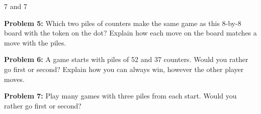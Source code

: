 \documentclass[12pt]{extarticle}
\newcommand{\prob}[1]{\textbf{Problem #1:}}
\begin{document}
\begin{minipage}[b]{1.55in}
\vspace{0.12in}7 and 7

\vspace{0.35in}
\end{minipage}
\vspace{0.6in}

\noindent\begin{minipage}[t]{3.3in}\vspace{0pt}\raggedright
\prob{5} Which two piles of counters make the same game as this 8-by-8 board with the token on the dot? Explain how each move on the board matches a move with the piles.
\end{minipage}\hfill\begin{minipage}[t]{3.3in}\vspace{0pt}\raggedleft
{}
\end{minipage}

\newpage
\prob{6} A game starts with piles of 52 and 37 counters. Would you rather go first or second? Explain how you can always win, however the other player moves.

\vspace{3.9in}

\prob{7} Play many games with three piles from each start. Would you rather go first or second?
\end{document}
